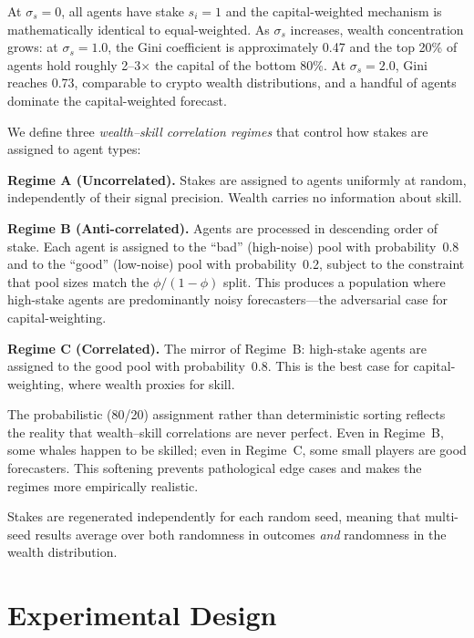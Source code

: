 \documentclass[conference]{IEEEtran}
\begin{document}
At $\sigma_s = 0$, all agents have stake $s_i = 1$ and the capital-weighted mechanism is mathematically identical to equal-weighted. As $\sigma_s$ increases, wealth concentration grows: at $\sigma_s = 1.0$, the Gini coefficient is approximately 0.47 and the top 20\% of agents hold roughly 2--3$\times$ the capital of the bottom 80\%. At $\sigma_s = 2.0$, Gini reaches 0.73, comparable to crypto wealth distributions, and a handful of agents dominate the capital-weighted forecast.

We define three \emph{wealth--skill correlation regimes} that control how stakes are assigned to agent types:

\textbf{Regime A (Uncorrelated).} Stakes are assigned to agents uniformly at random, independently of their signal precision. Wealth carries no information about skill.

\textbf{Regime B (Anti-correlated).} Agents are processed in descending order of stake. Each agent is assigned to the ``bad'' (high-noise) pool with probability~0.8 and to the ``good'' (low-noise) pool with probability~0.2, subject to the constraint that pool sizes match the $\phi / (1-\phi)$ split. This produces a population where high-stake agents are predominantly noisy forecasters---the adversarial case for capital-weighting.

\textbf{Regime C (Correlated).} The mirror of Regime~B: high-stake agents are assigned to the good pool with probability~0.8. This is the best case for capital-weighting, where wealth proxies for skill.

The probabilistic (80/20) assignment rather than deterministic sorting reflects the reality that wealth--skill correlations are never perfect. Even in Regime~B, some whales happen to be skilled; even in Regime~C, some small players are good forecasters. This softening prevents pathological edge cases and makes the regimes more empirically realistic.

Stakes are regenerated independently for each random seed, meaning that multi-seed results average over both randomness in outcomes \emph{and} randomness in the wealth distribution.

\section{Experimental Design}
\label{sec:experiments}
\end{document}
